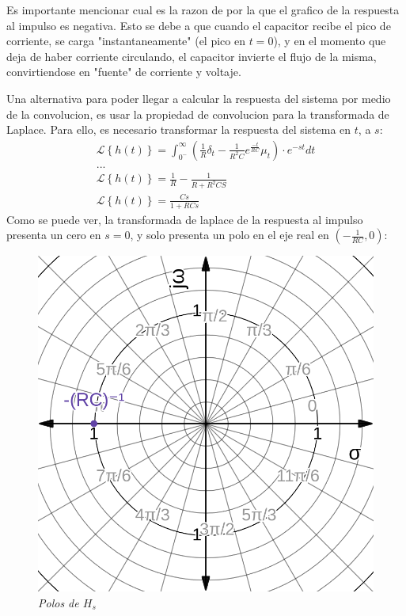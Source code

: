 \documentclass[12pt,a4paper]{report}
\begin{document}
\begin{enumerate}[label=\alph*)]
      Es importante mencionar cual es la razon de por la que el grafico de la respuesta al impulso es negativa.
      Esto se debe a que cuando el capacitor recibe el pico de corriente, se carga "instantaneamente"
      (el pico en $t=0$), y en el momento que deja de haber corriente circulando, el capacitor invierte el flujo de la
      misma, convirtiendose en "fuente" de corriente y voltaje.

      Una alternativa para poder llegar a calcular la respuesta del sistema por medio de la convolucion, es usar la
      propiedad de convolucion para la transformada de Laplace. Para ello, es necesario transformar la respuesta del
      sistema en $t$, a $s$:
      \begin{gather*}
        \mathcal{L}\left\{h(t)\right\} = \int_{0^-}^{\infty} \left(\frac{1}{R} \delta_t - \frac{1}{R^2C}e^{\frac{-t}{RC}} 
          \mu_t\right) \cdot e^{-st} dt\\
        ...\\
        \mathcal{L}\left\{h(t)\right\} = \frac{1}{R} - \frac{1}{R+R^2CS}\\
        \mathcal{L}\left\{h(t)\right\} = \frac{Cs}{1+RCs}
      \end{gather*}
      Como se puede ver, la transformada de laplace de la respuesta al impulso presenta un cero en $s = 0$, y solo
      presenta un polo en el eje real en $\left(-\frac{1}{RC},0\right)$:

      \noindent
      \begin{figure}[h]
        \centering
        \begin{minipage}[h]{0.4\textwidth}
          \centering
          \includegraphics[width=1\textwidth]{./images/ej4.4.png}
          \textit{Polos de $H_s$}
        \end{minipage}
      \end{figure}


\end{enumerate}
\end{document}
